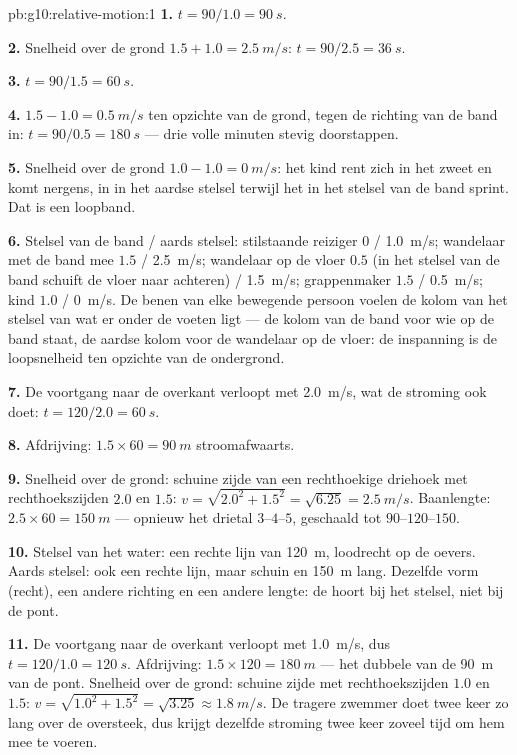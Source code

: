 \begin{solution}{pb:g10:relative-motion:1}
\textbf{1.} $t = 90/1.0 = \qty{90}{s}$.

\textbf{2.} Snelheid over de grond $1.5 + 1.0 = \qty{2.5}{m/s}$:
$t = 90/2.5 = \qty{36}{s}$.

\textbf{3.} $t = 90/1.5 = \qty{60}{s}$.

\textbf{4.} $1.5 - 1.0 = \qty{0.5}{m/s}$ ten opzichte van de grond,
tegen de richting van de band in: $t = 90/0.5 = \qty{180}{s}$ --- drie
volle minuten stevig doorstappen.

\textbf{5.} Snelheid over de grond $1.0 - 1.0 = \qty{0}{m/s}$: het kind
rent zich in het zweet en komt nergens, in  in het aardse stelsel
terwijl het in het stelsel van de band sprint. Dat is een loopband.

\textbf{6.} Stelsel van de band / aards stelsel: stilstaande reiziger $0$
/ \qty{1.0}{m/s}; wandelaar met de band mee $1.5$ / \qty{2.5}{m/s};
wandelaar op de vloer $0.5$ (in het stelsel van de band schuift de vloer
naar achteren) / \qty{1.5}{m/s}; grappenmaker $1.5$ / \qty{0.5}{m/s};
kind $1.0$ / \qty{0}{m/s}. De benen van elke bewegende persoon voelen de
kolom van het stelsel van wat er onder de voeten ligt --- de kolom van de
band voor wie op de band staat, de aardse kolom voor de wandelaar op de
vloer: de inspanning is de loopsnelheid ten opzichte van de ondergrond.

\textbf{7.} De voortgang naar de overkant verloopt met \qty{2.0}{m/s},
wat de stroming ook doet: $t = 120/2.0 = \qty{60}{s}$.

\textbf{8.} Afdrijving: $1.5 \times 60 = \qty{90}{m}$ stroomafwaarts.

\textbf{9.} Snelheid over de grond: schuine zijde van een rechthoekige
driehoek met rechthoekszijden $2.0$ en $1.5$:
$v = \sqrt{2.0^2 + 1.5^2} = \sqrt{6.25} = \qty{2.5}{m/s}$. Baanlengte:
$2.5 \times 60 = \qty{150}{m}$ --- opnieuw het drietal $3$--$4$--$5$,
geschaald tot $90$--$120$--$150$.

\textbf{10.} Stelsel van het water: een rechte lijn van \qty{120}{m},
loodrecht op de oevers. Aards stelsel: ook een rechte lijn, maar schuin
en \qty{150}{m} lang. Dezelfde vorm (recht), een andere richting en een
andere lengte: de  hoort bij het stelsel, niet bij de pont.

\textbf{11.} De voortgang naar de overkant verloopt met \qty{1.0}{m/s},
dus $t = 120/1.0 = \qty{120}{s}$. Afdrijving:
$1.5 \times 120 = \qty{180}{m}$ --- het dubbele van de \qty{90}{m} van
de pont. Snelheid over de grond: schuine zijde met rechthoekszijden
$1.0$ en $1.5$: $v = \sqrt{1.0^2 + 1.5^2} = \sqrt{3.25}
\approx \qty{1.8}{m/s}$. De tragere zwemmer doet twee keer zo lang over
de oversteek, dus krijgt dezelfde stroming twee keer zoveel tijd om hem
mee te voeren.


\end{solution}
